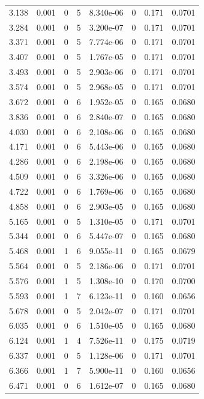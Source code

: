 \documentclass[preview]{standalone}
\begin{document}
{{\begin{tabular}{L{1.2cm}C{1.2cm} C{0.3cm}C{0.5cm} C{1.4cm}C{1.4cm} C{1.4cm}C{1.4cm}}
  3.138  &  0.001  & 0     &  5 &  8.340e-06  & 0  & 0.171 &  0.0701   \\ 
  3.284  &  0.001  & 0     &  5 &  3.200e-07  & 0  & 0.171 &  0.0701   \\ 
  3.371  &  0.001  & 0     &  5 &  7.774e-06  & 0  & 0.171 &  0.0701   \\ 
  3.407  &  0.001  & 0     &  5 &  1.767e-05  & 0  & 0.171 &  0.0701   \\ 
  3.493  &  0.001  & 0     &  5 &  2.903e-06  & 0  & 0.171 &  0.0701   \\ 
  3.574  &  0.001  & 0     &  5 &  2.968e-05  & 0  & 0.171 &  0.0701   \\ 
  3.672  &  0.001  & 0     &  6 &  1.952e-05  & 0  & 0.165 &  0.0680   \\ 
  3.836  &  0.001  & 0     &  6 &  2.840e-07  & 0  & 0.165 &  0.0680   \\ 
  4.030  &  0.001  & 0     &  6 &  2.108e-06  & 0  & 0.165 &  0.0680   \\ 
  4.171  &  0.001  & 0     &  6 &  5.443e-06  & 0  & 0.165 &  0.0680   \\ 
  4.286  &  0.001  & 0     &  6 &  2.198e-06  & 0  & 0.165 &  0.0680   \\ 
  4.509  &  0.001  & 0     &  6 &  3.326e-06  & 0  & 0.165 &  0.0680   \\ 
  4.722  &  0.001  & 0     &  6 &  1.769e-06  & 0  & 0.165 &  0.0680   \\ 
  4.858  &  0.001  & 0     &  6 &  2.903e-05  & 0  & 0.165 &  0.0680   \\ 
  5.165  &  0.001  & 0     &  5 &  1.310e-05  & 0  & 0.171 &  0.0701   \\ 
  5.344  &  0.001  & 0     &  6 &  5.447e-07  & 0  & 0.165 &  0.0680   \\ 
  5.468  &  0.001  & 1     &  6 &  9.055e-11  & 0  & 0.165 &  0.0679   \\ 
  5.564  &  0.001  & 0     &  5 &  2.186e-06  & 0  & 0.171 &  0.0701   \\ 
  5.576  &  0.001  & 1     &  5 &  1.308e-10  & 0  & 0.170 &  0.0700   \\ 
  5.593  &  0.001  & 1     &  7 &  6.123e-11  & 0  & 0.160 &  0.0656   \\ 
  5.678  &  0.001  & 0     &  5 &  2.042e-07  & 0  & 0.171 &  0.0701   \\ 
  6.035  &  0.001  & 0     &  6 &  1.510e-05  & 0  & 0.165 &  0.0680   \\ 
  6.124  &  0.001  & 1     &  4 &  7.526e-11  & 0  & 0.175 &  0.0719   \\ 
  6.337  &  0.001  & 0     &  5 &  1.128e-06  & 0  & 0.171 &  0.0701   \\ 
  6.366  &  0.001  & 1     &  7 &  5.900e-11  & 0  & 0.160 &  0.0656   \\ 
  6.471  &  0.001  & 0     &  6 &  1.612e-07  & 0  & 0.165 &  0.0680   \\ 
\hline 
\end{tabular} 

}}
\end{document}
